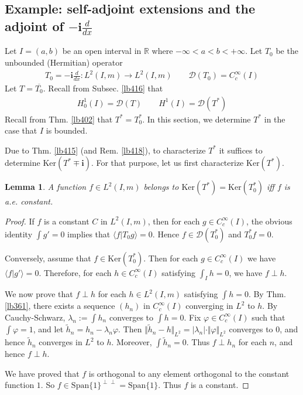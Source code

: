 \documentclass[12pt,b5paper,notitlepage]{article}
\theoremstyle{definition}
\theoremstyle{plain}
\newtheorem{lm}[df]{Lemma}
\newcommand{\wtd}{\widetilde}
\newcommand{\ovl}{\overline}
\newcommand{\Dom}{\mathscr{D}}
\newcommand{\Span}{\mathrm{Span}}
\newcommand{\bk}[1]{\langle {#1}\rangle}
\newcommand{\im}{\mathbf{i}}
\newcommand{\Rbb}{\mathbb R}
\newcommand{\Ker}{\mathrm{Ker}}
\numberwithin{equation}{section}
\begin{document}
\subsection{Example: self-adjoint extensions and the adjoint of $-\im\frac d{dx}$}\label{lb425}


Let $I=(a,b)$ be an open interval in $\Rbb$ where $-\infty<a<b<+\infty$. Let $T_0$ be the unbounded (Hermitian) operator 
\begin{gather*}
T_0=-\im\frac d{dx}:L^2(I,m)\rightarrow L^2(I,m)\qquad \Dom(T_0)=C_c^\infty(I)
\end{gather*}
Let $T=\ovl{T_0}$. Recall from Subsec. \ref{lb416} that
\begin{align*}
H^1_0(I)=\Dom(T)\qquad H^1(I)=\Dom(T^*)
\end{align*}
Recall from Thm. \ref{lb402} that $T^*=T_0^*$. In this section, we determine $T^*$ in the case that $I$ is bounded.


Due to Thm. \ref{lb415} (and Rem. \ref{lb418}), to characterize $T^*$ it suffices to determine $\Ker(T^*\mp\im)$. For that purpose, let us first characterize $\Ker(T^*)$.

\begin{lm}\label{lb421}
A function $f\in L^2(I,m)$ belongs to $\Ker(T^*)=\Ker(T_0^*)$ iff $f$ is a.e. constant.
\end{lm}



\begin{proof}
If $f$ is a constant $C$ in $L^2(I,m)$, then for each $g\in C_c^\infty(I)$, the obvious identity $\int g'=0$ implies that $\bk{f|T_0g}=0$. Hence $f\in\Dom(T_0^*)$ and $T_0^*f=0$.

Conversely, assume that $f\in\Ker(T_0^*)$. Then for each $g\in C_c^\infty(I)$ we have $\bk{f|g'}=0$. Therefore, for each $h\in C_c^\infty(I)$ satisfying $\int_I h=0$, we have $f\perp h$.

We now prove that $f\perp h$ for each $h\in L^2(I,m)$ satisfying $\int h=0$. By Thm. \ref{lb361}, there exists a sequence $(h_n)$ in $C_c^\infty(I)$ converging in $L^2$ to $h$. By Cauchy-Schwarz, $\lambda_n:=\int h_n$ converges to $\int h=0$. Fix $\varphi\in C_c^\infty(I)$ such that $\int\varphi=1$, and let $\wtd h_n=h_n-\lambda_n\varphi$. Then $\Vert\wtd h_n-h\Vert_{L^2}=|\lambda_n|\cdot \Vert\varphi\Vert_{L^2}$ converges to $0$, and hence $\wtd h_n$ converges in $L^2$ to $h$. Moreover, $\int \wtd h_n=0$. Thus $f\perp h_n$ for each $n$, and hence $f\perp h$.

We have proved that $f$ is orthogonal to any element orthogonal to the constant function $1$. So $f\in \Span\{1\}^{\perp\perp}=\Span\{1\}$. Thus $f$ is a constant.
\end{proof}
\end{document}
